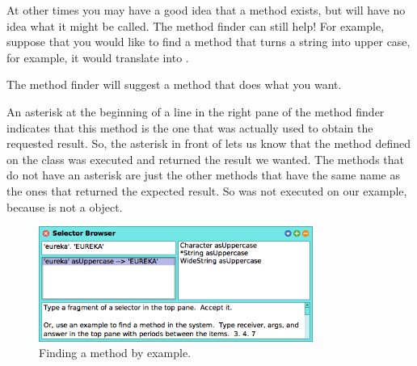 \documentclass[a4paper,10pt,twoside]{book}
\begin{document}
At other times you may have a good idea that a method exists, but will have no idea what it might be called.
The method finder can still help!  For example, suppose that you would like to find a method that turns a string into upper case, for example, it would translate  into .

\noindent
The method finder will suggest a method that does what you want.

An asterisk at the beginning of a line in the right pane of the method finder indicates that this method is the one that was actually used to obtain the requested result. 
So, the asterisk in front of  lets us know that the method  defined on the class  was executed and returned the result we wanted. The methods that do not have an asterisk are just the other methods that have the same name as the ones that returned the expected result. So  was not executed on our example, because  is not a  object.

\begin{figure}[hbt]
\centerline {\includegraphics[width=0.8\textwidth]{MethodFinder-example1}}
\caption{Finding a method by example.
\label{fig:methodFinder-example1}}
\end{figure}
\end{document}
